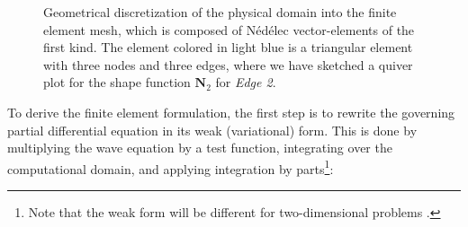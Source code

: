     \begin{figure}[tb]
        \centering

        \caption{Geometrical discretization of the physical domain into the finite
            element mesh, which is composed of Nédélec vector-elements of the first kind. The element colored
            in light blue is a triangular element with three nodes and three edges, where
            we have sketched a quiver plot for the shape function $\mathbf{N}_2$ for \textit{Edge
            2}.}
        \label{fig:fem}
    \end{figure}
    
    To derive the finite element formulation, the first step is to rewrite the governing partial differential equation in its weak (variational) form. This is done by multiplying the wave equation by a test function, integrating over the computational domain, and applying integration by parts\footnote{Note that the weak form will be different for two-dimensional problems \cite{ownpub0, ownpub2}.}:

